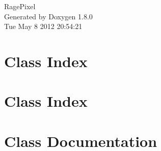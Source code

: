 \documentclass{book}
\begin{document}
\hypersetup{pageanchor=false,citecolor=blue}
\begin{titlepage}
\vspace*{7cm}
\begin{center}
{\Large Rage\-Pixel }\\
\vspace*{1cm}
{\large Generated by Doxygen 1.8.0}\\
\vspace*{0.5cm}
{\small Tue May 8 2012 20:54:21}\\
\end{center}
\end{titlepage}
\clearemptydoublepage
{}
\tableofcontents
\clearemptydoublepage
{}
\hypersetup{pageanchor=true,citecolor=blue}
\chapter{Class Index}

\chapter{Class Index}

\chapter{Class Documentation}




















\printindex
\end{document}
